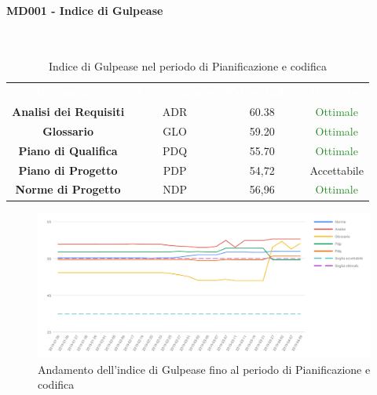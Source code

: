 \paragraph{MD001 - Indice di Gulpease}\mbox{}\\[0,3cm]
\begin{table}[H]
	\centering
	\begin{tabular}{cccc}
	\rowcolor{greySWEight}
	\textcolor{white}{\textbf{Documento}} & 
	\textcolor{white}{\textbf{Abbreviazione}} &
	\textcolor{white}{\textbf{Valore Indice}}&
	\textcolor{white}{\textbf{Riscontro}}\\
	
	\textbf{Analisi dei Requisiti} & ADR & 60.38 & \textcolor{ForestGreen}{Ottimale} \\
	\textbf{Glossario} & GLO & 59.20 & \textcolor{ForestGreen}{Ottimale} \\
	\textbf{Piano di Qualifica} & PDQ & 55.70 & \textcolor{ForestGreen}{Ottimale} \\
	\textbf{Piano di Progetto} & PDP & 54,72 & \textcolor{YellowOrange}{Accettabile} \\
	\textbf{Norme di Progetto} & NDP & 56,96 & \textcolor{ForestGreen}{Ottimale} \\

	\end{tabular}
	\caption{Indice di Gulpease nel periodo di Pianificazione e codifica}
\end{table}

\begin{figure}[H]
	\includegraphics[width=1\linewidth]{sez/App_Esito/Qualifica/graph/gulpeaseRq.pdf}
	\caption{Andamento dell'indice di Gulpease fino al periodo di Pianificazione e codifica}
\end{figure}